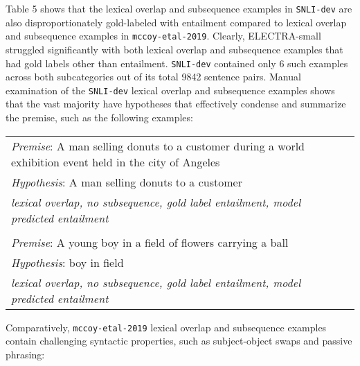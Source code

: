 \documentclass[11pt,a4paper]{article}
\begin{document}
Table 5 shows that the lexical overlap and subsequence examples in \texttt{SNLI-dev} are also disproportionately gold-labeled with entailment compared to lexical overlap and subsequence examples in \texttt{mccoy-etal-2019}. Clearly, ELECTRA-small struggled significantly with both lexical overlap and subsequence examples that had gold labels other than entailment. \texttt{SNLI-dev} contained only 6 such examples across both subcategories out of its total 9842 sentence pairs. Manual examination of the \texttt{SNLI-dev} lexical overlap and subsequence examples shows that the vast majority have hypotheses that effectively condense and summarize the premise, such as the following examples:

\begin{table}[hbt!]
\begin{center}
\tiny
\begin{tabular}{p{} p{}}

\textit{Premise}: A man selling donuts to a customer during a world exhibition event held in the city of Angeles \\
\textit{Hypothesis}: A man selling donuts to a customer \\
\textit{lexical overlap, no subsequence, gold label entailment, model predicted entailment} \\

\\

\textit{Premise}: A young boy in a field of flowers carrying a ball \\
\textit{Hypothesis}: boy in field \\
\textit{lexical overlap, no subsequence, gold label entailment, model predicted entailment}

\end{tabular}
\end{center}
\end{table}

Comparatively, \texttt{mccoy-etal-2019} lexical overlap and subsequence examples contain challenging syntactic properties, such as subject-object swaps and passive phrasing:
\end{document}
